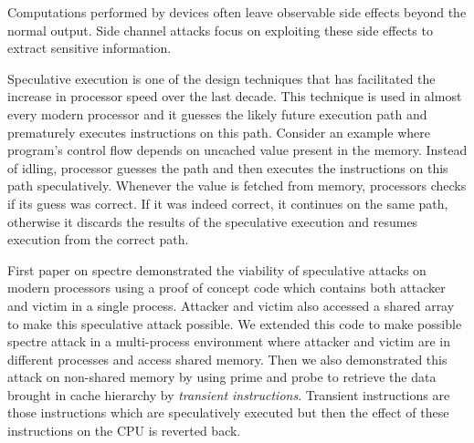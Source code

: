 Computations performed by devices often leave observable side effects beyond the normal output. Side channel attacks focus on exploiting these side effects to extract sensitive information. 

Speculative execution is one of the design techniques that has facilitated the increase in processor speed over the last decade. This technique is used in almost every modern processor and it guesses the likely future execution path and prematurely executes instructions on this path. Consider an example where program's control flow depends on uncached value present in the memory. Instead of idling, processor guesses the path and then executes the instructions on this path speculatively. Whenever the value is fetched from memory, processors checks if its guess was correct. If it was indeed correct, it continues on the same path, otherwise it discards the results of the speculative execution and resumes execution from the correct path.

First paper on spectre\cite{spectre} demonstrated the viability of speculative attacks on modern processors using a proof of concept code which contains both attacker and victim in a single process. Attacker and victim also accessed a shared array to make this speculative attack possible. We extended this code to make possible spectre attack in a multi-process environment where attacker and victim are in different processes and access shared memory. Then we also demonstrated this attack on non-shared memory by using prime and probe to retrieve the data brought in cache hierarchy by \textit{transient instructions}. Transient instructions are those instructions which are speculatively executed but then the effect of these instructions on the CPU is reverted back.
